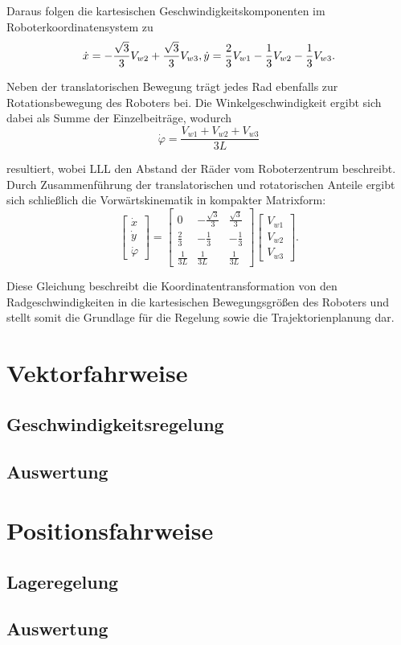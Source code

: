 Daraus folgen die kartesischen Geschwindigkeitskomponenten im Roboterkoordinatensystem zu
\begin{equation}
    \dot{x} = -\frac{\sqrt{3}}{3} V_{w2} + \frac{\sqrt{3}}{3} V_{w3}, \\
    \dot{y} = \frac{2}{3} V_{w1} - \frac{1}{3} V_{w2} - \frac{1}{3} V_{w3}.
\end{equation}

Neben der translatorischen Bewegung trägt jedes Rad ebenfalls zur Rotationsbewegung des Roboters bei. Die Winkelgeschwindigkeit ergibt sich dabei als Summe der Einzelbeiträge, wodurch
\begin{equation}
\dot{\varphi} = \frac{V_{w1} + V_{w2} + V_{w3}}{3L}
\end{equation}

resultiert, wobei LLL den Abstand der Räder vom Roboterzentrum beschreibt.
Durch Zusammenführung der translatorischen und rotatorischen Anteile ergibt sich schließlich die Vorwärtskinematik in kompakter Matrixform:
\begin{equation}
    \begin{bmatrix}
        \dot{x}\\
        \dot{y}\\
        \dot{\varphi}
    \end{bmatrix}
    =
    \begin{bmatrix}
        0 & -\frac{\sqrt{3}}{3} & \frac{\sqrt{3}}{3}\\
        \frac{2}{3} & -\frac{1}{3} & -\frac{1}{3}\\
        \frac{1}{3L} & \frac{1}{3L} & \frac{1}{3L}
    \end{bmatrix}
    \begin{bmatrix}
        V_{w1}\\
        V_{w2}\\
        V_{w3}
    \end{bmatrix}.
    \label{eq:Koordinatentransformation}
\end{equation}

Diese Gleichung beschreibt die Koordinatentransformation von den Radgeschwindigkeiten in die kartesischen Bewegungsgrößen des Roboters und stellt somit die Grundlage für die Regelung sowie die Trajektorienplanung dar.

\section{Vektorfahrweise}
\subsection{Geschwindigkeitsregelung}
\subsection{Auswertung}

\section{Positionsfahrweise}
\subsection{Lageregelung}
\subsection{Auswertung}